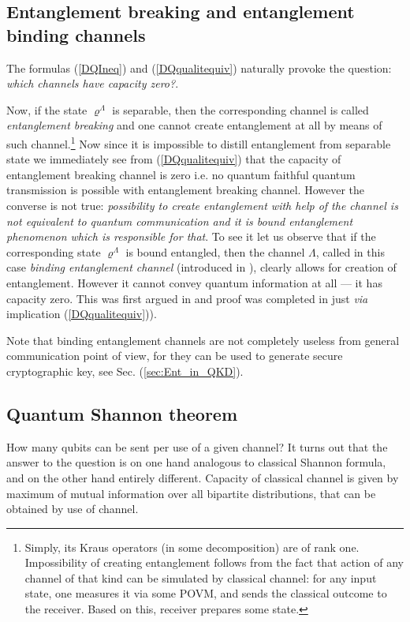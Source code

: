 \documentclass[rmp,12pt,preprint]{revtex4-2}
\begin{document}
\subsection{Entanglement breaking and entanglement binding channels}
The formulas (\ref{DQIneq}) and (\ref{DQqualitequiv}) naturally provoke
the question: {\it which channels have capacity zero?}.

Now, if the state $\varrho^{\Lambda}$ is separable, then the
corresponding channel is called {\it entanglement breaking}
\cite{ShorHR-break} and one cannot create entanglement at all  by
means of such channel.\footnote{Simply, its Kraus operators (in
some decomposition) are of rank one. Impossibility of creating
entanglement follows from  the fact that action of any channel of
that kind can be simulated  by classical channel: for any input
state, one measures it via some POVM, and sends the classical
outcome to the receiver. Based on this, receiver prepares some
state.} Now since it is impossible to distill entanglement from
separable state we immediately see from (\ref{DQqualitequiv}) that
the capacity of entanglement breaking channel is zero i.e. no
quantum faithful quantum transmission is possible with entanglement
breaking channel. However the converse is not true: {\it possibility
to create entanglement with help of the channel is not equivalent to
quantum communication and it is bound entanglement phenomenon which
is responsible for that}. To see it let us observe that if  the
corresponding state $\varrho^{\Lambda}$ is bound entangled, then the
channel $\Lambda$, called in this case {\it binding
entanglement channel} (introduced in \cite{bechan,UPB2}), clearly
allows for creation of entanglement. However it cannot convey
quantum information at all --- it has capacity zero.  This was first
argued in \cite{bechan} and proof was completed in \cite{PHCEJP}
just {\it via} implication (\ref{DQqualitequiv})).


Note that binding entanglement channels are not completely useless
from general communication point of view, for they can be
used to generate secure cryptographic key, see Sec.
(\ref{sec:Ent_in_QKD}).

\subsection{Quantum Shannon theorem}
\label{subsec:quantum-shannon-th}
How many qubits can be sent
per use of a given channel? It turns out that the answer to the
question is on one hand analogous to classical Shannon formula, and
on the other hand entirely different. Capacity of classical channel
is given by maximum of mutual information over all bipartite
distributions, that can be obtained by use of channel.
\end{document}
